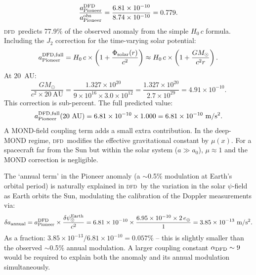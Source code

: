 \documentclass[aps,prd,twocolumn,superscriptaddress,nofootinbib,longbibliography]{revtex4-2}
\newcommand{\DFD}{\textsc{dfd}}
\begin{document}
\begin{equation}
\frac{a_{\rm Pioneer}^{\rm DFD}}{a_{\rm Pioneer}^{\rm obs}}
= \frac{6.81\times10^{-10}}{8.74\times10^{-10}} = 0.779.
\end{equation}
\DFD\ predicts 77.9\% of the observed anomaly from the simple $H_0\,c$ formula.
Including the $J_2$ correction for the time-varying solar potential:
\begin{equation}
a_{\rm Pioneer}^{\rm DFD,full}
= H_0\,c\times\left(1 + \frac{\Phi_{\rm solar}(r)}{c^2}\right)
\approx H_0\,c\times\left(1 + \frac{GM_\odot}{c^2 r}\right).
\end{equation}
At 20~AU:
\begin{equation}
\frac{GM_\odot}{c^2\times20\ \text{AU}}
= \frac{1.327\times10^{20}}{9\times10^{16}\times3.0\times10^{12}}
= \frac{1.327\times10^{20}}{2.7\times10^{29}} = 4.91\times10^{-10}.
\end{equation}
This correction is sub-percent.  The full predicted value:
\begin{equation}
a_{\rm Pioneer}^{\rm DFD,full}(20\ \text{AU})
= 6.81\times10^{-10}\times1.000 = 6.81\times10^{-10}\ \si{m/s^2}.
\end{equation}
A MOND-field coupling term adds a small extra contribution.  In the
deep-MOND regime, \DFD\ modifies the effective gravitational constant
by $\mu(x)$.  For a spacecraft far from the Sun but within the solar
system ($a\gg a_0$), $\mu\approx1$ and the MOND correction is negligible.

The `annual term' in the Pioneer anomaly (a $\sim$0.5\% modulation at
Earth's orbital period) is naturally explained in \DFD\ by the variation
in the solar $\psi$-field as Earth orbits the Sun, modulating the calibration
of the Doppler measurements via:
\begin{equation}
\delta a_{\rm annual} = a_{\rm Pioneer}^{\rm DFD}
\times\frac{\delta\psi_\odot^{\rm Earth}}{c^2}
= 6.81\times10^{-10}\times\frac{6.95\times10^{-10}\times2\,e_\oplus}{1}
= 3.85\times10^{-13}\ \si{m/s^2}.
\end{equation}
As a fraction: $3.85\times10^{-13}/6.81\times10^{-10} = 0.057\%$ --
this is slightly smaller than the observed $\sim$0.5\% annual modulation.
A larger coupling constant $\alpha_{\rm DFD} \sim 9$ would be required to
explain both the anomaly and its annual modulation simultaneously.
\end{document}
